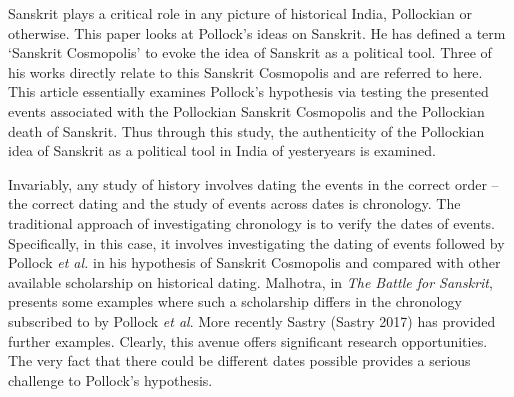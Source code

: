 Sanskrit plays a critical role in any picture of historical India, Pollockian or otherwise. This paper looks at Pollock’s ideas on Sanskrit. He has defined a term ‘Sanskrit Cosmopolis’ to evoke the idea of Sanskrit as a political tool. Three of his works directly relate to this Sanskrit Cosmopolis and are referred to here. This article essentially examines Pollock’s hypothesis via testing the presented events associated with the Pollockian Sanskrit Cosmopolis and the Pollockian death of Sanskrit. Thus through this study, the authenticity of the Pollockian idea of Sanskrit as a political tool in India of yesteryears is examined.

Invariably, any study of history involves dating the events in the correct order – the correct dating and the study of events across dates is chronology. The traditional approach of investigating chronology is to verify the dates of events. Specifically, in this case, it involves investigating the dating of events followed by Pollock \textit{et al.} in his hypothesis of Sanskrit Cosmopolis and compared with other available scholarship on historical dating. Malhotra, in \textit{The Battle for Sanskrit}, presents some examples where such a scholarship differs in the chronology subscribed to by Pollock \textit{et al}. More recently Sastry (Sastry 2017) has provided further examples. Clearly, this avenue offers significant research opportunities. The very fact that there could be different dates possible provides a serious challenge to Pollock’s hypothesis.

